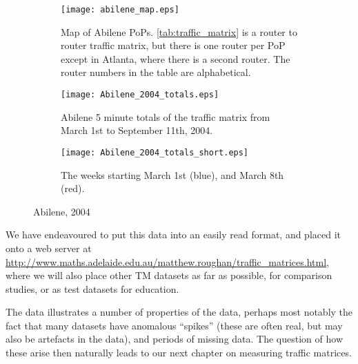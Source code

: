 \begin{figure}[thbp] 
  \begin{center}

    \begin{subfigure}[b]{\oneup}
      \centering
      \texttt{[image: abilene\_map.eps]}
      \vspace{-5mm}
      \caption{Map of Abilene PoPs. \autoref{tab:traffic_matrix} is a
        router to router traffic matrix, but there is one router per
        PoP except in Atlanta, where there is a second router. The
        router numbers in the table are alphabetical.}
      \label{fig:abilene_2004_map}
    \end{subfigure}

    \vspace{3mm}
    \begin{subfigure}[b]{\oneup}
      \centering
      \texttt{[image: Abilene\_2004\_totals.eps]}
      \vspace{-9mm}
      \caption{Abilene 5 minute totals of the traffic matrix from
        March 1st to September 11th, 2004.}
      \label{fig:abilene_2004_a}
    \end{subfigure}

    \vspace{3mm}
    \begin{subfigure}[b]{\oneup}
      \centering
      \texttt{[image: Abilene\_2004\_totals\_short.eps]}
      \vspace{-8mm}
      \caption{The weeks starting March 1st (blue), and March 8th (red).}
      \label{fig:abilene_2004_b} 
    \end{subfigure}  
       
    \vspace{2mm}
    \caption{Abilene, 2004\label{fig:abilene_2004}}
  \end{center}
\end{figure}         

We have endeavoured to put this data into an easily read format, and
placed it onto a web server at 
\url{http://www.maths.adelaide.edu.au/matthew.roughan/traffic_matrices.html},
where we will also place other TM datasets as far as possible, for
comparison studies, or as test datasets for education.

The data illustrates a number of properties of the data, perhaps most notably
the fact that many datasets have anomalous ``spikes'' (these are often
real, but may also be artefacts in the data), and periods of missing
data. The question of how these arise then naturally leads to our next
chapter on measuring traffic matrices. 
  